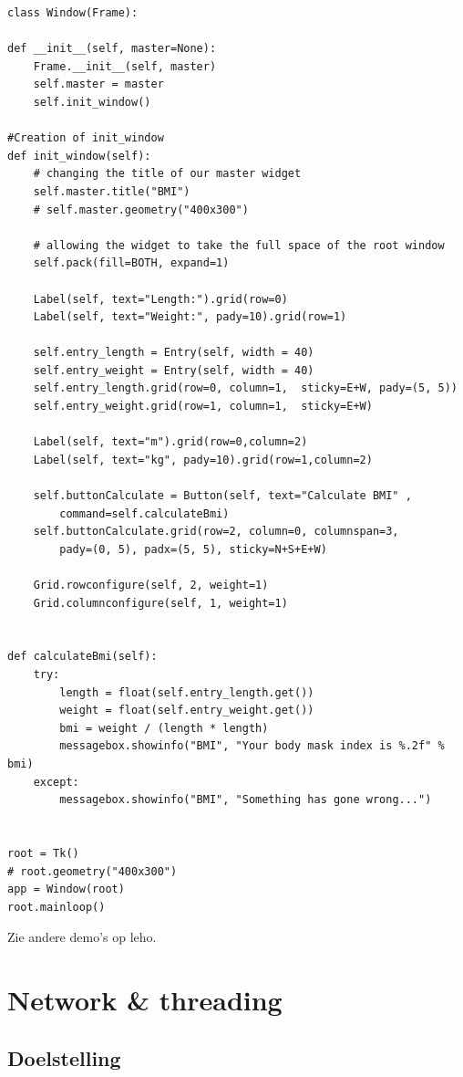 \documentclass{article}
\begin{document}
\begin{verbatim}
class Window(Frame):

def __init__(self, master=None):
    Frame.__init__(self, master)
    self.master = master
    self.init_window()

#Creation of init_window
def init_window(self):
    # changing the title of our master widget
    self.master.title("BMI")
    # self.master.geometry("400x300")

    # allowing the widget to take the full space of the root window
    self.pack(fill=BOTH, expand=1)

    Label(self, text="Length:").grid(row=0)
    Label(self, text="Weight:", pady=10).grid(row=1)

    self.entry_length = Entry(self, width = 40)
    self.entry_weight = Entry(self, width = 40)
    self.entry_length.grid(row=0, column=1,  sticky=E+W, pady=(5, 5))
    self.entry_weight.grid(row=1, column=1,  sticky=E+W)

    Label(self, text="m").grid(row=0,column=2)
    Label(self, text="kg", pady=10).grid(row=1,column=2)

    self.buttonCalculate = Button(self, text="Calculate BMI" , 
        command=self.calculateBmi)
    self.buttonCalculate.grid(row=2, column=0, columnspan=3, 
        pady=(0, 5), padx=(5, 5), sticky=N+S+E+W)

    Grid.rowconfigure(self, 2, weight=1)
    Grid.columnconfigure(self, 1, weight=1)


def calculateBmi(self):
    try:
        length = float(self.entry_length.get())
        weight = float(self.entry_weight.get())
        bmi = weight / (length * length)
        messagebox.showinfo("BMI", "Your body mask index is %.2f" % bmi)
    except:
        messagebox.showinfo("BMI", "Something has gone wrong...")


root = Tk()
# root.geometry("400x300")
app = Window(root)
root.mainloop()
\end{verbatim}

Zie andere demo's op leho.

\section{Network \& threading}

\subsection{Doelstelling}
\end{document}

